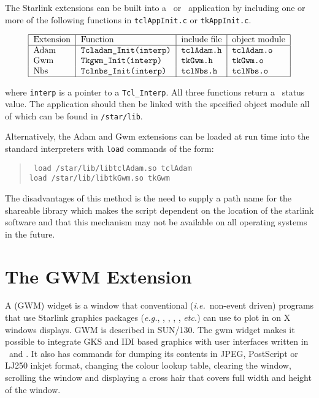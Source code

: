 The Starlink extensions can be built into a \Tcl\ or \Tk\ application
by including one or more of the following functions in
{\tt{tclAppInit.c}} or {\tt{tkAppInit.c}}.

\[\begin{tabular}{|l|l|l|l|}
\hline
Extension &Function &include file &object module\\
\hline
Adam &\tt Tcladam\_Init(interp) &\tt tclAdam.h &\tt tclAdam.o\\
Gwm &\tt Tkgwm\_Init(interp) &\tt tkGwm.h &\tt tkGwm.o\\
Nbs &\tt Tclnbs\_Init(interp) &\tt tclNbs.h &\tt tclNbs.o\\
\hline
\end{tabular}\]

where {\tt{interp}} is a pointer to a {\tt{Tcl\_Interp}}. All three functions
return a \Tcl\ status value. The application should then be linked with the
specified object module all of which can be found in {\tt{/star/lib}}.

Alternatively,
the Adam and Gwm extensions can be loaded at run time into
the standard interpreters with {\tt{load}} commands of the form:
\begin{quote}{\tt
load /star/lib/libtclAdam.so tclAdam\\
load /star/lib/libtkGwm.so tkGwm
}\end{quote}

The disadvantages of this method is the need to supply a path name for
the shareable library which makes the script dependent on the location
of the starlink software and that this mechanism may not be available
on all operating systems in the future.

\section{\label{gwm_extension}The GWM Extension}

A  (GWM) widget is a window that
conventional ({\em{i.e.}}\ non-event driven) programs that use
Starlink graphics packages ({\em{e.g.}},
,
,
,
,
 {\em{etc.}}) can use
to plot in on X windows displays. GWM is described in SUN/130. The gwm widget
makes it possible to integrate GKS and IDI based graphics with user interfaces
written in \Tcl\ and \Tk.  It also has commands for dumping its contents
in JPEG, PostScript or LJ250 inkjet format, changing the colour lookup table,
clearing the window, scrolling the window  and displaying a cross hair
that covers full width and height of the window.

